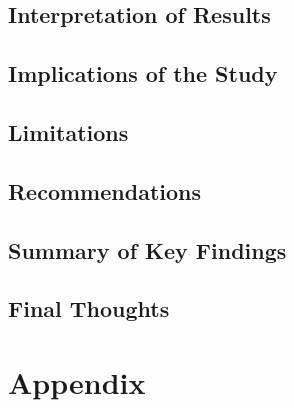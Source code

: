 \documentclass[
  11pt,
  letterpaper,
  DIV=11,
  numbers=noendperiod]{scrartcl}
\numberwithin{figure}{section}
\begin{document}
\subsection{Interpretation of Results}\label{interpretation-of-results}

\subsection{Implications of the Study}\label{implications-of-the-study}

\subsection{Limitations}\label{limitations}

\subsection{Recommendations}\label{recommendations}

\subsection{Summary of Key Findings}\label{summary-of-key-findings}

\subsection{Final Thoughts}\label{final-thoughts}

\section{Appendix}\label{appendix}
\end{document}
